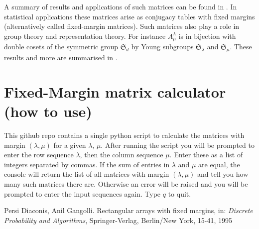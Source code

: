 \documentclass[11pt]{article} %
\begin{document}
A summary of results and applications of such matrices can be found in \cite{DG95}. In statistical applications these matrices arise as conjugacy tables with fixed margins (alternatively called fixed-margin matrices). Such matrices also play a role in group theory and representation theory. For instance $A^{\lambda}_{\mu}$ is in bijection with double cosets of the symmetric group $\mathfrak{S}_d$ by Young subgroups $\mathfrak{S}_{\lambda}$ and $\mathfrak{S}_{\mu}$. These results and more are summarised in \cite{DG95}.

\section{Fixed-Margin matrix calculator (how to use)}

This github repo contains a single python script to calculate the matrices with margin $(\lambda, \mu)$ for a given $\lambda$, $\mu$. After running the script you will be prompted to enter the row sequence $\lambda$, then the column sequence $\mu$. Enter these as a list of integers separated by commas. If the sum of entries in $\lambda$ and $\mu$ are equal, the console will return the list of all matrices with margin $(\lambda, \mu)$ and tell you how many such matrices there are. Otherwise an error will be raised and you will be prompted to enter the input sequences again. Type $q$ to quit.

\begin{thebibliography}{MOY98}

Persi Diaconis, Anil Gangolli.
\newblock Rectangular arrays with fixed margins,
\newblock in: {\em Discrete Probability and Algorithms},
\newblock Springer-Verlag, Berlin/New York, 15-41, 1995 

\end{thebibliography}
\end{document}
